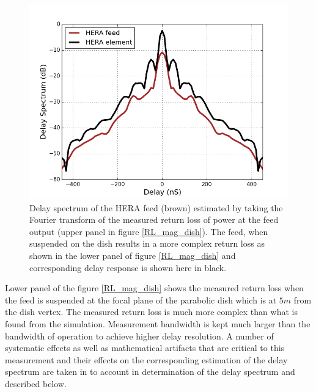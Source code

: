\documentclass[twocolumn]{emulateapj}
\begin{document}
    \begin{figure}       
    \centering
    \includegraphics[width=\linewidth]{GB_reflectometry_part3/plot/ds_feed_dish.png}
    \caption{Delay spectrum of the HERA feed (brown) estimated by taking the Fourier transform of the measured return loss of power at the feed output (upper panel in figure \ref{RL_mag_dish}). The feed, when suspended on the dish results in a more complex return loss as shown in the lower panel of figure \ref{RL_mag_dish} and corresponding delay response is shown here in black. }
    \label{ds_feed_on_dish_trans}
    \end{figure}
    
    Lower panel of the figure \ref{RL_mag_dish} shows the measured return loss when
    the feed is suspended at the focal plane of the parabolic dish which is at $5m$
    from the dish vertex. The measured return loss is much more complex than what
    is found from the simulation. 
    Measurement bandwidth is kept much larger than the bandwidth of operation to
    achieve higher delay resolution. A number of systematic effects as well as
    mathematical artifacts that are critical to this measurement and their effects
    on the corresponding estimation of the delay spectrum are taken in to account
    in determination of the delay spectrum and described below. 
    
\end{document}
